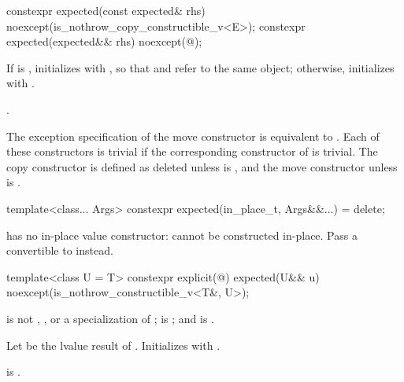 %
\begin{itemdecl}
constexpr expected(const expected& rhs) noexcept(is_nothrow_copy_constructible_v<E>);
constexpr expected(expected&& rhs) noexcept(@\seebelow@);
\end{itemdecl}

\begin{itemdescr}

\pnum
\effects
If  is , initializes  with , so that  and  refer to the same object; otherwise, initializes  with .

\pnum
\ensures
{}.

\pnum
\remarks
The exception specification of the move constructor is equivalent to . Each of these constructors is trivial if the corresponding constructor of  is trivial. The copy constructor is defined as deleted unless  is , and the move constructor unless  is .
\end{itemdescr}

%
\begin{itemdecl}
template<class... Args>
  constexpr expected(in_place_t, Args&&...) = delete;
\end{itemdecl}

\begin{itemdescr}
\pnum
\remarks
{} has no in-place value constructor:  cannot be constructed in-place. Pass a  convertible to  instead.
\end{itemdescr}

%
\begin{itemdecl}
template<class U = T>
  constexpr explicit(@\seebelow@) expected(U&& u) noexcept(is_nothrow_constructible_v<T&, U>);
\end{itemdecl}

\begin{itemdescr}
\pnum
\constraints
{} is not , , or a specialization of ;  is ; and  is .

\pnum
\effects
Let  be the lvalue result of . Initializes  with .

\pnum
\ensures
{} is .
\end{itemdescr}

